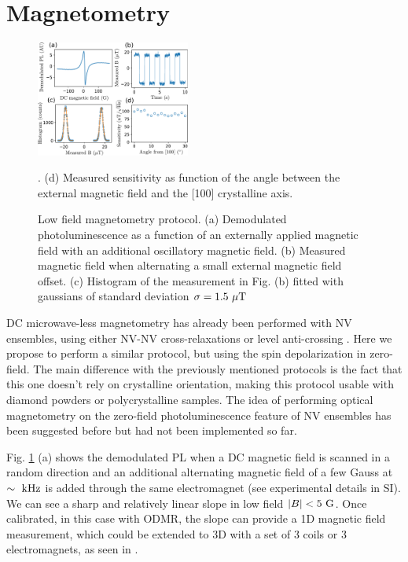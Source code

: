 \documentclass[preprintnumbers,amsmath,amssymb,superscriptaddress,twocolumn,showpacs]{revtex4-2}
\begin{document}
\section*{Magnetometry}
\begin{figure}
\includegraphics[width=0.45\textwidth]{Figures/fig_magneto}
\caption{Low field magnetometry protocol. (a) Demodulated photoluminescence as a function of an externally applied magnetic field with an additional oscillatory magnetic field. (b) Measured magnetic field when alternating a small external magnetic field offset. (c) Histogram of the measurement in Fig. (b) fitted with gaussians of standard deviation $\sigma=1.5\ \mu \rm T$}. (d) Measured sensitivity as function of the angle between the external magnetic field and the [100] crystalline axis.
\label{magneto}
\end{figure}
%
DC microwave-less magnetometry has already been performed with NV ensembles, using either NV-NV cross-relaxations \citep{akhmedzhanov_microwave-free_2017,akhmedzhanov_magnetometry_2019} or level anti-crossing \citep{Wickenbrock, zheng2017level, zheng_microwave-free_2020}. Here we propose to perform a similar protocol, but using the spin depolarization in zero-field. The main difference with the previously mentioned protocols is the fact that this one doesn't rely on crystalline orientation, making this protocol usable with diamond powders or polycrystalline samples. The idea of performing optical magnetometry on the zero-field photoluminescence feature of NV ensembles has been suggested before \cite{filimonenko2018weak, filimonenko2022manifestation} but had not been implemented so far.

Fig. \ref{magneto} (a) shows the demodulated PL when a DC magnetic field is scanned in a random direction and an additional alternating magnetic field of a few Gauss at $\sim \ \rm kHz$ is added through the same electromagnet (see experimental details in SI). We can see a sharp and relatively linear slope in low field $\abs{B} < 5\ \rm G$. Once calibrated, in this case with ODMR, the slope can provide a 1D magnetic field measurement, which could be extended to 3D with a set of 3 coils or 3 electromagnets, as seen in \cite{zheng_microwave-free_2020}.
\end{document}
